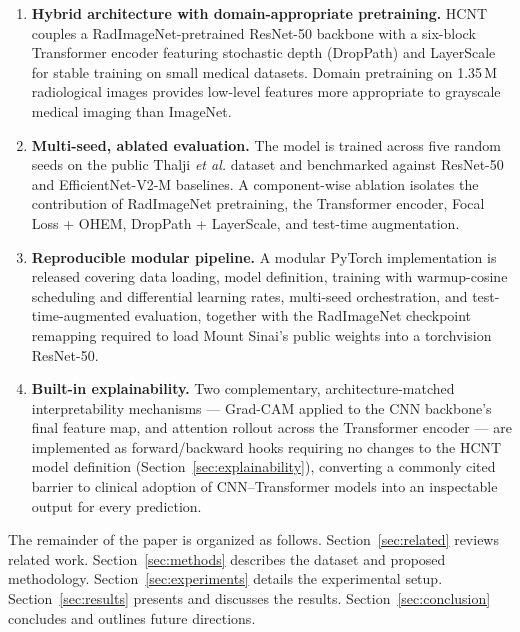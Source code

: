 \documentclass[conference]{IEEEtran}
\newcommand{\HCNT}{\textsc{HCNT}\xspace}
\newcommand{\etal}{\textit{et al.}\xspace}
\begin{document}
\begin{enumerate}
  \item \textbf{Hybrid architecture with domain-appropriate pretraining.}
        \HCNT couples a RadImageNet-pretrained ResNet-50 backbone
        \cite{mei2022radimagenet} with a six-block Transformer encoder
        featuring stochastic depth (DropPath) and LayerScale for stable
        training on small medical datasets. Domain pretraining on 1.35\,M
        radiological images provides low-level features more appropriate to
        grayscale medical imaging than ImageNet.

  \item \textbf{Multi-seed, ablated evaluation.}
        The model is trained across five random seeds on the public Thalji
        \etal dataset \cite{thalji2024} and benchmarked against ResNet-50 and
        EfficientNet-V2-M baselines. A component-wise ablation isolates the
        contribution of RadImageNet pretraining, the Transformer encoder,
        Focal Loss + OHEM, DropPath + LayerScale, and test-time augmentation.

  \item \textbf{Reproducible modular pipeline.}
        A modular PyTorch implementation is released covering data loading,
        model definition, training with warmup-cosine scheduling and
        differential learning rates, multi-seed orchestration, and
        test-time-augmented evaluation, together with the RadImageNet
        checkpoint remapping required to load Mount Sinai's public weights
        into a torchvision ResNet-50.

  \item \textbf{Built-in explainability.}
        Two complementary, architecture-matched interpretability mechanisms
        --- Grad-CAM \cite{selvaraju2017gradcam} applied to the CNN
        backbone's final feature map, and attention rollout
        \cite{abnar2020rollout} across the Transformer encoder --- are
        implemented as forward/backward hooks requiring no changes to the
        \HCNT model definition (Section~\ref{sec:explainability}),
        converting a commonly cited barrier to clinical adoption of
        CNN--Transformer models into an inspectable output for every
        prediction.
\end{enumerate}

The remainder of the paper is organized as follows.
Section~\ref{sec:related} reviews related work.
Section~\ref{sec:methods} describes the dataset and proposed methodology.
Section~\ref{sec:experiments} details the experimental setup.
Section~\ref{sec:results} presents and discusses the results.
Section~\ref{sec:conclusion} concludes and outlines future directions.
\end{document}
